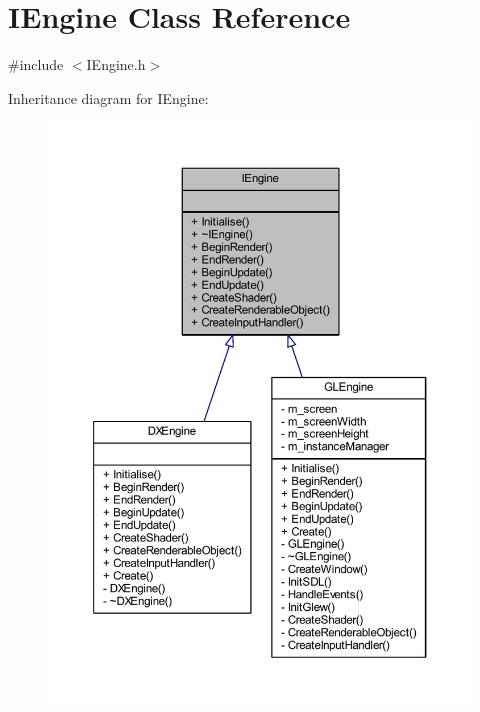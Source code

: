 \hypertarget{class_i_engine}{}\section{I\+Engine Class Reference}
\label{class_i_engine}


{\ttfamily \#include $<$I\+Engine.\+h$>$}



Inheritance diagram for I\+Engine\+:\nopagebreak
\begin{figure}[H]
\begin{center}
\leavevmode
\includegraphics[width=350pt]{class_i_engine__inherit__graph}
\end{center}
\end{figure}


